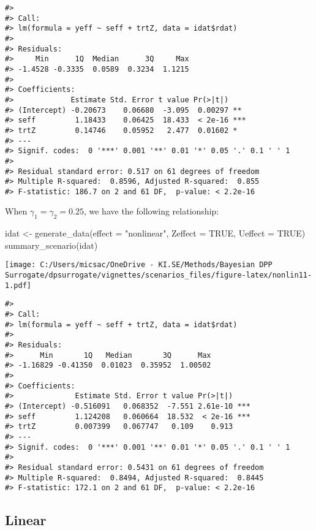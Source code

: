 \documentclass[
]{article}
\newenvironment{Shaded}{\begin{snugshade}}{\end{snugshade}}
\newcommand{\AttributeTok}[1]{\textcolor[rgb]{0.77,0.63,0.00}{#1}}
\newcommand{\ConstantTok}[1]{\textcolor[rgb]{0.00,0.00,0.00}{#1}}
\newcommand{\FunctionTok}[1]{\textcolor[rgb]{0.00,0.00,0.00}{#1}}
\newcommand{\NormalTok}[1]{#1}
\newcommand{\OtherTok}[1]{\textcolor[rgb]{0.56,0.35,0.01}{#1}}
\newcommand{\StringTok}[1]{\textcolor[rgb]{0.31,0.60,0.02}{#1}}
\begin{document}
\begin{verbatim}
#> 
#> Call:
#> lm(formula = yeff ~ seff + trtZ, data = idat$rdat)
#> 
#> Residuals:
#>     Min      1Q  Median      3Q     Max 
#> -1.4528 -0.3335  0.0589  0.3234  1.1215 
#> 
#> Coefficients:
#>             Estimate Std. Error t value Pr(>|t|)    
#> (Intercept) -0.20673    0.06680  -3.095  0.00297 ** 
#> seff         1.18433    0.06425  18.433  < 2e-16 ***
#> trtZ         0.14746    0.05952   2.477  0.01602 *  
#> ---
#> Signif. codes:  0 '***' 0.001 '**' 0.01 '*' 0.05 '.' 0.1 ' ' 1
#> 
#> Residual standard error: 0.517 on 61 degrees of freedom
#> Multiple R-squared:  0.8596, Adjusted R-squared:  0.855 
#> F-statistic: 186.7 on 2 and 61 DF,  p-value: < 2.2e-16
\end{verbatim}

When \(\gamma_1 = \gamma_2 = 0.25\), we have the following relationship:

\begin{Shaded}
\begin{Highlighting}[]
\NormalTok{idat }\OtherTok{\textless{}{-}} \FunctionTok{generate\_data}\NormalTok{(}\AttributeTok{effect =} \StringTok{"nonlinear"}\NormalTok{, }\AttributeTok{Zeffect =} \ConstantTok{TRUE}\NormalTok{, }\AttributeTok{Ueffect =} \ConstantTok{TRUE}\NormalTok{)}
\FunctionTok{summary\_scenario}\NormalTok{(idat)}
\end{Highlighting}
\end{Shaded}

\texttt{[image: C:/Users/micsac/OneDrive - KI.SE/Methods/Bayesian DPP Surrogate/dpsurrogate/vignettes/scenarios\_files/figure-latex/nonlin11-1.pdf]}

\begin{verbatim}
#> 
#> Call:
#> lm(formula = yeff ~ seff + trtZ, data = idat$rdat)
#> 
#> Residuals:
#>      Min       1Q   Median       3Q      Max 
#> -1.16829 -0.41350  0.01023  0.35952  1.00502 
#> 
#> Coefficients:
#>              Estimate Std. Error t value Pr(>|t|)    
#> (Intercept) -0.516091   0.068352  -7.551 2.61e-10 ***
#> seff         1.124208   0.060664  18.532  < 2e-16 ***
#> trtZ         0.007399   0.067747   0.109    0.913    
#> ---
#> Signif. codes:  0 '***' 0.001 '**' 0.01 '*' 0.05 '.' 0.1 ' ' 1
#> 
#> Residual standard error: 0.5431 on 61 degrees of freedom
#> Multiple R-squared:  0.8494, Adjusted R-squared:  0.8445 
#> F-statistic: 172.1 on 2 and 61 DF,  p-value: < 2.2e-16
\end{verbatim}

\hypertarget{linear}{%
\subsection{Linear}\label{linear}}
\end{document}
